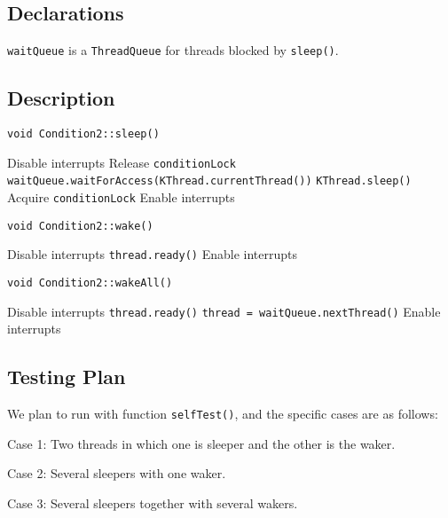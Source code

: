 \documentclass{article}
\begin{document}
\begin{spacing}{1.1}
\subsection{Declarations}
\texttt{waitQueue} is a \texttt{ThreadQueue} for threads blocked by \texttt{sleep()}.
\subsection{Description}
\begin{algorithm}
\caption{ \texttt{void Condition2::sleep()}}
\begin{algorithmic}
\STATE Disable interrupts
\STATE Release \texttt{conditionLock}
\STATE \texttt{waitQueue.waitForAccess(KThread.currentThread())}
\STATE	\texttt{KThread.sleep()}
\STATE Acquire \texttt{conditionLock}
\STATE Enable interrupts
\end{algorithmic}
\end{algorithm}

\begin{algorithm}
\caption{ \texttt{void Condition2::wake()}}
\begin{algorithmic}
\STATE Disable interrupts
\STATE \texttt{thread.ready()}
\ENDIF
\STATE Enable interrupts
\end{algorithmic}
\end{algorithm}

\begin{algorithm}
\caption{ \texttt{void Condition2::wakeAll()}}
\begin{algorithmic}
\STATE Disable interrupts
\STATE \texttt{thread.ready()}
\STATE \texttt{thread = waitQueue.nextThread()}
\ENDWHILE
\STATE Enable interrupts
\end{algorithmic}
\end{algorithm}

\subsection{Testing Plan}
We plan to run with function \texttt{selfTest()}, and the specific cases are as follows:
\begin{asparaitem}
  \item Case 1: Two threads in which one is sleeper and the other is the waker.
  \item Case 2: Several sleepers with one waker.
  \item Case 3: Several sleepers together with several wakers.
\end{asparaitem}

\end{spacing}
\end{document}
